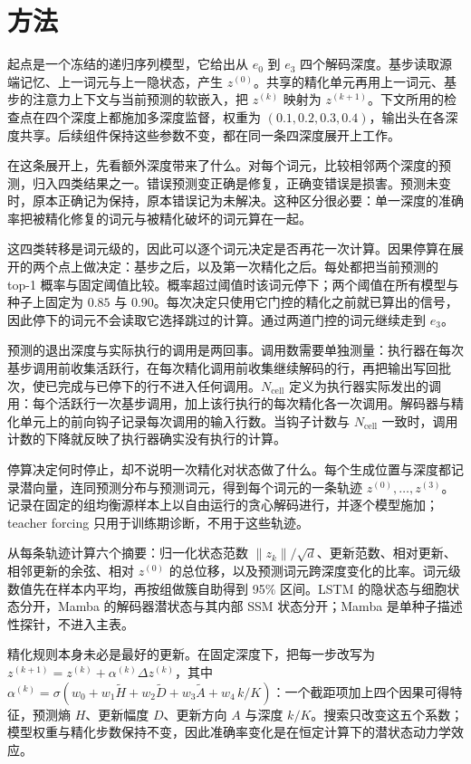\documentclass[12pt,a4paper]{article}
\begin{document}
\section{方法}
\label{sec:method}

起点是一个冻结的递归序列模型，它给出从 $e_0$ 到 $e_3$ 四个解码深度。基步读取源端记忆、上一词元与上一隐状态，产生 $z^{(0)}$。共享的精化单元再用上一词元、基步的注意力上下文与当前预测的软嵌入，把 $z^{(k)}$ 映射为 $z^{(k+1)}$。下文所用的检查点在四个深度上都施加多深度监督，权重为 $(0.1,0.2,0.3,0.4)$，输出头在各深度共享。后续组件保持这些参数不变，都在同一条四深度展开上工作。

在这条展开上，先看额外深度带来了什么。对每个词元，比较相邻两个深度的预测，归入四类结果之一。错误预测变正确是修复，正确变错误是损害。预测未变时，原本正确记为保持，原本错误记为未解决。这种区分很必要：单一深度的准确率把被精化修复的词元与被精化破坏的词元算在一起。

这四类转移是词元级的，因此可以逐个词元决定是否再花一次计算。因果停算在展开的两个点上做决定：基步之后，以及第一次精化之后。每处都把当前预测的 top-1 概率与固定阈值比较。概率超过阈值时该词元停下；两个阈值在所有模型与种子上固定为 $0.85$ 与 $0.90$。每次决定只使用它门控的精化之前就已算出的信号，因此停下的词元不会读取它选择跳过的计算。通过两道门控的词元继续走到 $e_3$。

预测的退出深度与实际执行的调用是两回事。调用数需要单独测量：执行器在每次基步调用前收集活跃行，在每次精化调用前收集继续解码的行，再把输出写回批次，使已完成与已停下的行不进入任何调用。$N_{\mathrm{cell}}$ 定义为执行器实际发出的调用：每个活跃行一次基步调用，加上该行执行的每次精化各一次调用。解码器与精化单元上的前向钩子记录每次调用的输入行数。当钩子计数与 $N_{\mathrm{cell}}$ 一致时，调用计数的下降就反映了执行器确实没有执行的计算。

停算决定何时停止，却不说明一次精化对状态做了什么。每个生成位置与深度都记录潜向量，连同预测分布与预测词元，得到每个词元的一条轨迹 $z^{(0)},\dots,z^{(3)}$。记录在固定的组均衡源样本上以自由运行的贪心解码进行，并逐个模型施加；teacher forcing 只用于训练期诊断，不用于这些轨迹。

从每条轨迹计算六个摘要：归一化状态范数 $\lVert z_k\rVert/\sqrt d$、更新范数、相对更新、相邻更新的余弦、相对 $z^{(0)}$ 的总位移，以及预测词元跨深度变化的比率。词元级数值先在样本内平均，再按组做簇自助得到 95\% 区间。LSTM 的隐状态与细胞状态分开，Mamba 的解码器潜状态与其内部 SSM 状态分开；Mamba 是单种子描述性探针，不进入主表。

精化规则本身未必是最好的更新。在固定深度下，把每一步改写为 $z^{(k+1)}=z^{(k)}+\alpha^{(k)}\Delta z^{(k)}$，其中 $\alpha^{(k)}=\sigma(w_0+w_1\tilde H+w_2\tilde D+w_3\tilde A+w_4\,k/K)$：一个截距项加上四个因果可得特征，预测熵 $H$、更新幅度 $D$、更新方向 $A$ 与深度 $k/K$。搜索只改变这五个系数；模型权重与精化步数保持不变，因此准确率变化是在恒定计算下的潜状态动力学效应。
\end{document}

